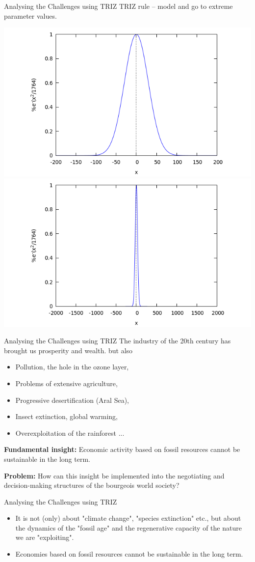 \documentclass{beamer}
\begin{document}
\begin{frame}{Analysing the Challenges using TRIZ}
  TRIZ rule -- model and go to extreme parameter values.
  \begin{center}
    \includegraphics[width=.45\textwidth]{Bilder/RMZ1it.png}\hfill
    \includegraphics[width=.45\textwidth]{Bilder/mP650q.png}
  \end{center}
\end{frame}

\begin{frame}{Analysing the Challenges using TRIZ}
  The industry of the 20th century has brought us prosperity and wealth.  but
  also
\begin{itemize}
\item Pollution, the hole in the ozone layer,
\item Problems of extensive agriculture,
\item Progressive desertification (Aral Sea),
\item Insect extinction, global warming,
\item Overexploitation of the rainforest ...
\end{itemize}

\textbf{Fundamental insight:} Economic activity based on fossil resources
cannot be sustainable in the long term.

\textbf{Problem:} How can this insight be implemented into the negotiating and
decision-making structures of the bourgeois world society?
\end{frame}

\begin{frame}{Analysing the Challenges using TRIZ}
  \begin{itemize}
  \item It is not (only) about "climate change", "species extinction" etc.,
    but about the dynamics of the "fossil age" and the regenerative capacity
    of the nature we are "exploiting".
  \item Economies based on fossil resources cannot be sustainable in the
    long term.  
  \end{itemize}
\end{frame}
\end{document}
